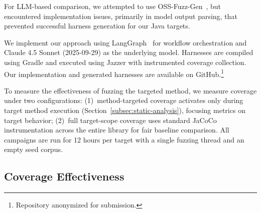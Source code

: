 For LLM-based comparison, we attempted to use OSS-Fuzz-Gen~\cite{CITE:OSSFuzzGen}, but encountered implementation issues, primarily in model output parsing, that prevented successful harness generation for our Java targets.
\par
We implement our approach using LangGraph~\cite{langgraph2024} for workflow orchestration and Claude 4.5 Sonnet (2025-09-29) as the underlying model. Harnesses are compiled using Gradle and executed using Jazzer with instrumented coverage collection. Our implementation and generated harnesses are available on GitHub.\footnote{Repository anonymized for submission.}
\par
To measure the effectiveness of fuzzing the targeted method, we measure coverage under two configurations: (1)~method-targeted coverage activates only during target method execution (Section~\ref{subsec:static-analysis}), focusing metrics on target behavior; (2)~full target-scope coverage uses standard JaCoCo instrumentation across the entire library for fair baseline comparison.
All campaigns are run for 12 hours per target with a single fuzzing thread and an empty seed corpus. 
\subsection{Coverage Effectiveness}%
\label{subsec:coverage-effectiveness}



